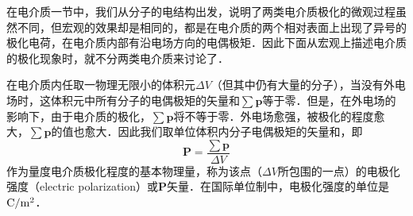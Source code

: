 
\begin{issues}
\end{issues}


在电介质一节中，我们从分子的电结构出发，说明了两类电介质极化的微观过程虽然不同，但宏观的效果却是相同的，都是在电介质的两个相对表面上出现了异号的极化电荷，在电介质内部有沿电场方向的电偶极矩．因此下面从宏观上描述电介质的极化现象时，就不分两类电介质来讨论了．

在电介质内任取一物理无限小的体积元$\Delta V$（但其中仍有大量的分子），当没有外电场时，这体积元中所有分子的电偶极矩的矢量和$\sum \mathbf p$等于零．但是，在外电场的影响下，由于电介质的极化，$\sum \mathbf p$将不等于零．外电场愈强，被极化的程度愈大，$\sum \mathbf p$的值也愈大．因此我们取单位体积内分子电偶极矩的矢量和，即
\begin{equation}
\mathbf P=\frac{\sum \mathbf p}{\Delta V} 
\end{equation}
作为量度电介质极化程度的基本物理量，称为该点（$\Delta V$所包围的一点）的电极化强度（electric polarization）或$\mathbf P$矢量．在国际单位制中，电极化强度的单位是$\rm C/m^2$．

